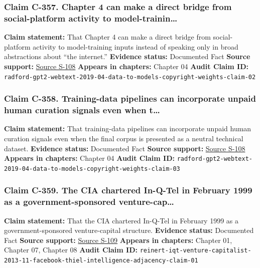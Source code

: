 \documentclass[
  american,
  11pt,
  letterpaper,
]{article}
\begin{document}
\subsubsection{Claim C-357. Chapter 4 can make a direct bridge from
social-platform activity to
model-trainin\ldots{}}\label{claim-c-357-chapter-4-can-make-a-direct-bridge-from-social-platform-activity-to-model-trainin}

\textbf{Claim statement:} That Chapter 4 can make a direct bridge from
social-platform activity to model-training inputs instead of speaking
only in broad abstractions about ``the internet.'' \textbf{Evidence
status:} Documented Fact \textbf{Source support:}
\hyperref[source-s-108-language-models-are-unsupervised-multitask-learners]{Source
S-108} \textbf{Appears in chapters:} Chapter 04 \textbf{Audit Claim ID:}
\texttt{radford-gpt2-webtext-2019-04-data-to-models-copyright-weights-claim-02}

\subsubsection{Claim C-358. Training-data pipelines can incorporate
unpaid human curation signals even when
t\ldots{}}\label{claim-c-358-training-data-pipelines-can-incorporate-unpaid-human-curation-signals-even-when-t}

\textbf{Claim statement:} That training-data pipelines can incorporate
unpaid human curation signals even when the final corpus is presented as
a neutral technical dataset. \textbf{Evidence status:} Documented Fact
\textbf{Source support:}
\hyperref[source-s-108-language-models-are-unsupervised-multitask-learners]{Source
S-108} \textbf{Appears in chapters:} Chapter 04 \textbf{Audit Claim ID:}
\texttt{radford-gpt2-webtext-2019-04-data-to-models-copyright-weights-claim-03}

\subsubsection{Claim C-359. The CIA chartered In-Q-Tel in February 1999
as a government-sponsored
venture-cap\ldots{}}\label{claim-c-359-the-cia-chartered-in-q-tel-in-february-1999-as-a-government-sponsored-venture-cap}

\textbf{Claim statement:} That the CIA chartered In-Q-Tel in February
1999 as a government-sponsored venture-capital structure.
\textbf{Evidence status:} Documented Fact \textbf{Source support:}
\hyperref[source-s-109-in-q-tel-the-central-intelligence-agency-as-venture-capitalist]{Source
S-109} \textbf{Appears in chapters:} Chapter 01, Chapter 07, Chapter 08
\textbf{Audit Claim ID:}
\texttt{reinert-iqt-venture-capitalist-2013-11-facebook-thiel-intelligence-adjacency-claim-01}
\end{document}
